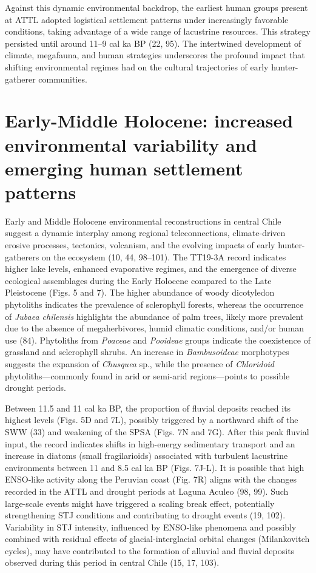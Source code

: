 \documentclass[
]{article}
\begin{document}
Against this dynamic environmental backdrop, the earliest human groups
present at ATTL adopted logistical settlement patterns under
increasingly favorable conditions, taking advantage of a wide range of
lacustrine resources. This strategy persisted until around 11--9 cal ka
BP (22, 95). The intertwined development of climate, megafauna, and
human strategies underscores the profound impact that shifting
environmental regimes had on the cultural trajectories of early
hunter-gatherer communities.

\section{Early-Middle Holocene: increased environmental variability and
emerging human settlement
patterns}\label{early-middle-holocene-increased-environmental-variability-and-emerging-human-settlement-patterns}

Early and Middle Holocene environmental reconstructions in central Chile
suggest a dynamic interplay among regional teleconnections,
climate-driven erosive processes, tectonics, volcanism, and the evolving
impacts of early hunter-gatherers on the ecosystem (10, 44, 98--101).
The TT19-3A record indicates higher lake levels, enhanced evaporative
regimes, and the emergence of diverse ecological assemblages during the
Early Holocene compared to the Late Pleistocene (Figs. 5 and 7). The
higher abundance of woody dicotyledon phytoliths indicates the
prevalence of sclerophyll forests, whereas the occurrence of
\emph{Jubaea chilensis} highlights the abundance of palm trees, likely
more prevalent due to the absence of megaherbivores, humid climatic
conditions, and/or human use (84). Phytoliths from \emph{Poaceae} and
\emph{Pooideae} groups indicate the coexistence of grassland and
sclerophyll shrubs. An increase in \emph{Bambusoideae} morphotypes
suggests the expansion of \emph{Chusquea} sp., while the presence of
\emph{Chloridoid} phytoliths---commonly found in arid or semi-arid
regions---points to possible drought periods.

Between 11.5 and 11 cal ka BP, the proportion of fluvial deposits
reached its highest levels (Figs. 5D and 7L), possibly triggered by a
northward shift of the SWW (33) and weakening of the SPSA (Figs. 7N and
7G). After this peak fluvial input, the record indicates shifts in
high-energy sedimentary transport and an increase in diatoms (small
fragilarioids) associated with turbulent lacustrine environments between
11 and 8.5 cal ka BP (Figs. 7J-L). It is possible that high ENSO-like
activity along the Peruvian coast (Fig. 7R) aligns with the changes
recorded in the ATTL and drought periods at Laguna Aculeo (98, 99). Such
large-scale events might have triggered a scaling break effect,
potentially strengthening STJ conditions and contributing to drought
events (19, 102). Variability in STJ intensity, influenced by ENSO-like
phenomena and possibly combined with residual effects of
glacial-interglacial orbital changes (Milankovitch cycles), may have
contributed to the formation of alluvial and fluvial deposits observed
during this period in central Chile (15, 17, 103).
\end{document}
